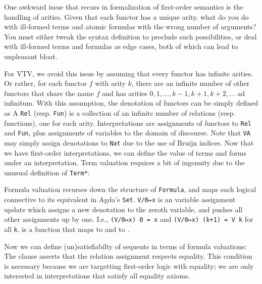 \documentclass[12pt]{article}
\begin{document}
One awkward issue that recurs in formalization of first-order semantics is the 
handling of arities. Given that each functor has a unique arity,
what do you do with ill-formed terms and atomic formulas with the wrong 
number of arguments? You must either tweak the syntax definition to 
preclude such possibilities, or deal with ill-formed terms and formulas as 
edge cases, both of which can lead to unpleasant bloat. 

For VTV, we avoid this issue by assuming that every functor has infinite arities.
Or rather, for each functor $f$ with arity $k$, there are an infinite number 
of other functors that share the name $f$ and has arities $0, 1, ..., k-1, k+1, k+2, ...$ 
ad infinitum. With this assumption, the denotation of functors can be 
simply defined as 
A \verb|Rel| (resp. \verb|Fun|) is a collection of an infinite number of 
relations (resp. functions), one for each arity. Interpretations are  
assignments of functors to \verb|Rel| and \verb|Fun|, plus assignments of
variables to the domain of discourse. Note that \verb|VA| may simply assign 
denotations to \verb|Nat| due to the use of Bruijn indices. 
Now that we have first-order interpretations, we can define the value 
of terms and forms under an interpretation. Term valuation requires a bit of
ingenuity due to the unusual definition of \verb|Term*|:


Formula valuation recurses down the structure of \verb|Formula|, and maps 
each logical connective to its equivalent in Agda's \verb|Set|.
\verb|V/0↦x| is an variable assignment update which assigns a new denotation 
to the zeroth variable, and pushes all other assignments up by one. I.e.,
\verb|(V/0↦x) 0 = x| and \verb|(V/0↦x) (k+1) = V k| for all \verb|k|. 
 is a function that maps 
to  and  to .

Now we can define (un)satisfiabilty of sequents in terms of formula valuations: 
The \AgdaSpace{} clause asserts that the
relation assignment  respects equality. This condition is necessary
because we are targetting first-order logic with equality; we are only 
interested in interpretations that satisfy all equality axioms.
\end{document}
